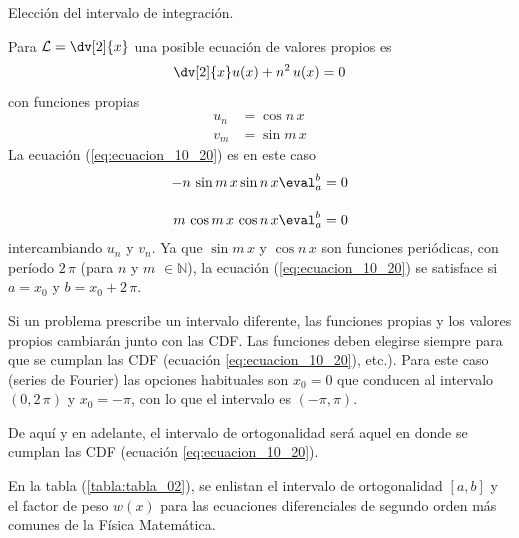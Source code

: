 \begin{ejemplo}{Elección del intervalo de integración.}

Para $\displaystyle \mathcal{L} = \dv[2]{x}$ una posible ecuación de valores propios es
\begin{equation}
\dv[2]{x} u(x) + n^{2} \, u(x) = 0
\label{eq:ecuacion_10_21}
\end{equation}
con funciones propias
\begin{align*}
u_{n} &= \cos n \, x \\
v_{m} &= \sin m \, x
\end{align*}
La ecuación (\ref{eq:ecuacion_10_20}) es en este caso
\begin{align*}
- n \, \sin m \, x \sin n \, x \eval^{b}_{a} &= 0 \\[1em]
m \, \cos m \, x \, \cos n \, x \eval^{b}_{a} &= 0 
\end{align*}
intercambiando $u_{n}$ y $v_{n}$. Ya que $\sin m \, x$ y $\cos n \, x$ son funciones periódicas, con período $2 \, \pi$ (para $n$ y $m$ $\in \mathbb{N}$), la ecuación (\ref{eq:ecuacion_10_20}) se satisface si $a = x_{0}$ y $b = x_{0} + 2 \, \pi$.
\par
Si un problema prescribe un intervalo diferente, las funciones propias y los valores propios cambiarán junto con las CDF. Las funciones deben elegirse siempre para que se cumplan las CDF (ecuación \ref{eq:ecuacion_10_20}), etc.). Para este caso (series de Fourier) las opciones habituales son $x_{0} = 0$ que conducen al intervalo $(0, 2 \, \pi)$ y $x_{0} = - \pi$, con lo que el intervalo es $(-\pi, \pi)$.
\end{ejemplo}
De aquí y en adelante, el intervalo de ortogonalidad será aquel en donde se cumplan las CDF (ecuación \ref{eq:ecuacion_10_20}).
\par
En la tabla (\ref{tabla:tabla_02}), se enlistan el intervalo de ortogonalidad $[a, b]$ y el factor de peso $w (x)$ para las ecuaciones diferenciales de segundo orden más comunes de la Física Matemática.
